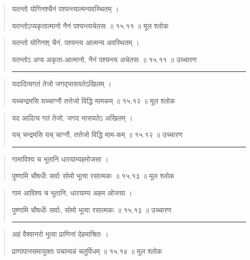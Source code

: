 \begin{quotation}

यतन्तो योगिनश्चैनं पश्यन्त्यात्मन्यवस्थितम्‌  ।  

यतन्तोऽप्यकृतात्मानो नैनं पश्यन्त्यचेतसः  ॥ १५.११ ॥  मूल श्लोक
\end{quotation}

\begin{quotation}

यतन्तो योगिनश् चैनं, पश्यन्त्य आत्मन्य अवस्थितम्‌  ।  

यतन्तोऽ अप्य अकृता-आत्मानो, नैनं पश्यन्त्य अचेतसः  ॥ १५.११ ॥  उच्चारण

\noindent\rule{16cm}{0.4pt} 
\end{quotation}


\begin{quotation}

यदादित्यगतं तेजो जगद्भासयतेऽखिलम्‌  ।  

यच्चन्द्रमसि यच्चाग्नौ तत्तेजो विद्धि मामकम्‌  ॥ १५.१२ ॥  मूल श्लोक
\end{quotation}

\begin{quotation}

यद आदित्य गतं तेजो, जगद  भासयतेऽ अखिलम्‌  ।  

यच् चन्द्रमसि यच् चाग्नौ, तत्तेजो विद्धि माम-कम्‌  ॥ १५.१२ ॥  उच्चारण

\noindent\rule{16cm}{0.4pt} 
\end{quotation}


\begin{quotation}

गामाविश्य च भूतानि धारयाम्यहमोजसा  ।  

पुष्णामि चौषधीः सर्वाः सोमो भूत्वा रसात्मकः  ॥ १५.१३ ॥  मूल श्लोक
\end{quotation}

\begin{quotation}

गाम आविश्य च भूतानि, धारयाम्य अहम ओजसा  ।  

पुष्णामि चौषधीः सर्वाः, सोमो भूत्वा रसात्मकः  ॥ १५.१३ ॥  उच्चारण

\noindent\rule{16cm}{0.4pt} 
\end{quotation}


\begin{quotation}

अहं वैश्वानरो भूत्वा प्राणिनां देहमाश्रितः  ।  

प्राणापानसमायुक्तः पचाम्यन्नं चतुर्विधम्‌  ॥ १५.१४ ॥  मूल श्लोक
\end{quotation}

